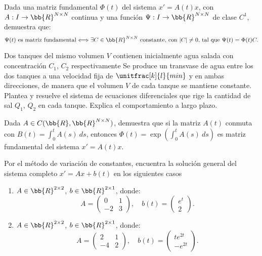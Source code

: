 \begin{ejercicio}\label{ej:5.7}
    Dada una matriz fundamental $\Phi(t)$ del sistema $x' = A(t)x$, con $A : I \to \bb{R}^{N\times N}$ continua y una función $\Psi : I \to \bb{R}^{N\times N}$ de clase $C^1$, demuestra que:
    \[
        \Psi(t) \text{ es matriz fundamental} \Longleftrightarrow \exists C \in \bb{R}^{N\times N} \text{ constante, con } |C|\neq 0 \text{, tal que } \Psi(t) = \Phi(t)C.
    \]
\end{ejercicio}

\begin{ejercicio}\label{ej:5.8}
    Dos tanques del mismo volumen $V$ contienen inicialmente agua salada con concentración $C_1$, $C_2$ respectivamente
    Se produce un transvase de agua entre los dos tanques a una velocidad fija de $\unitfrac[k]{l}{min}$ y en ambas direcciones, de manera que el volumen $V$ de cada tanque se mantiene constante. Plantea y resuelve el sistema de ecuaciones diferenciales que rige la cantidad de sal $Q_1$, $Q_2$ en cada tanque. Explica el comportamiento a largo plazo.
\end{ejercicio}

\begin{ejercicio}\label{ej:5.9}
    Dada $A \in C(\bb{R}, \bb{R}^{N\times N})$, demuestra que si la matriz $A(t)$ conmuta con $B(t) = \displaystyle \int_0^t A(s)~ds$, entonces $\Phi(t) = \exp\left(\displaystyle \int_0^t A(s)~ds\right)$ es matriz fundamental del sistema $x' = A(t)x$.
\end{ejercicio}

\begin{ejercicio}\label{ej:5.10}
    Por el método de variación de constantes, encuentra la solución general del sistema completo $x' = Ax + b(t)$ en los siguientes casos
    \begin{enumerate}
        \item $A\in \bb{R}^{2\times 2}$, $b\in \bb{R}^{2\times 1}$, donde:
        \[
            A =
            \begin{pmatrix}
                0 & 1\\
                -2 & 3
            \end{pmatrix},
            \quad
            b(t) =
            \begin{pmatrix}
                e^t \\ 2
            \end{pmatrix}.
        \]
        \item $A\in \bb{R}^{2\times 2}$, $b\in \bb{R}^{2\times 1}$, donde:
        \[
            A =
            \begin{pmatrix}
                2 & 1\\
                -4 & 2
            \end{pmatrix},
            \quad
            b(t) =
            \begin{pmatrix}
                te^{2t} \\ -e^{2t}
            \end{pmatrix}.
        \]
    \end{enumerate}
\end{ejercicio}

